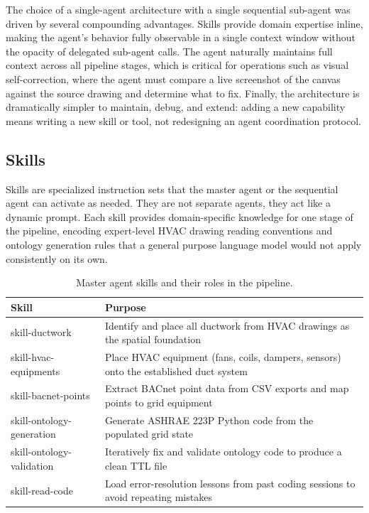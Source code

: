 \medskip
\noindent
The choice of a single-agent architecture with a single sequential sub-agent was driven by several compounding advantages.
Skills provide domain expertise inline, making the agent's behavior fully observable in a
single context window without the opacity of delegated sub-agent calls.
The agent naturally maintains full context across all pipeline stages, which is critical
for operations such as visual self-correction, where the agent must compare a live
screenshot of the canvas against the source drawing and determine what to fix.
Finally, the architecture is dramatically simpler to maintain, debug, and extend: adding
a new capability means writing a new skill or tool, not redesigning an agent coordination
protocol.

\subsection{Skills}
\label{subsec:skills}

Skills are specialized instruction sets that the master agent or the sequential agent can activate as needed.
They are not separate agents, they act like a dynamic prompt. 
Each skill provides domain-specific knowledge for one stage of the pipeline, encoding
expert-level HVAC drawing reading conventions and ontology generation rules that a general
purpose language model would not apply consistently on its own.

\begin{table}[htbp]
  \caption{Master agent skills and their roles in the pipeline.}
  \label{tab:skills}
  \centering
  \begin{tabular}{ll}
    \toprule
    \textbf{Skill} & \textbf{Purpose} \\
    \midrule
    skill-ductwork            & Identify and place all ductwork from HVAC drawings as the spatial foundation \\
    skill-hvac-equipments     & Place HVAC equipment (fans, coils, dampers, sensors) onto the established duct system \\
    skill-bacnet-points       & Extract BACnet point data from CSV exports and map points to grid equipment \\
    skill-ontology-generation & Generate ASHRAE 223P Python code from the populated grid state \\
    skill-ontology-validation & Iteratively fix and validate ontology code to produce a clean TTL file \\
    skill-read-code           & Load error-resolution lessons from past coding sessions to avoid repeating mistakes \\
    \bottomrule
  \end{tabular}
\end{table}

